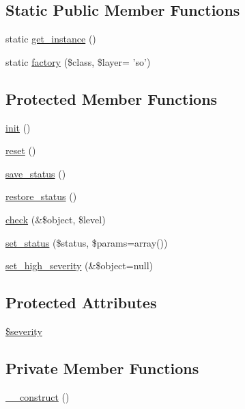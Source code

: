 \subsection*{Static Public Member Functions}
\begin{DoxyCompactItemize}
\item 
static \hyperlink{classOWL_ae75b698b8f0aa7f9106ce84744ff10ed}{get\_\-instance} ()
\item 
static \hyperlink{classOWL_aa6f4f99b9b0d6c77e7d49075d8a29d69}{factory} (\$class, \$layer= 'so')
\end{DoxyCompactItemize}
\subsection*{Protected Member Functions}
\begin{DoxyCompactItemize}
\item 
\hyperlink{class__OWL_ae0ef3ded56e8a6b34b6461e5a721cd3e}{init} ()
\item 
\hyperlink{class__OWL_a2f2a042bcf31965194c03033df0edc9b}{reset} ()
\item 
\hyperlink{class__OWL_a9e49b9c76fbc021b244c6915ea536d71}{save\_\-status} ()
\item 
\hyperlink{class__OWL_a465eeaf40edd9f9c848841700c32ce55}{restore\_\-status} ()
\item 
\hyperlink{class__OWL_ad6f4f6946f40199dd0333cf219fa500e}{check} (\&\$object, \$level)
\item 
\hyperlink{class__OWL_aea912d0ede9b3c2a69b79072d94d4787}{set\_\-status} (\$status, \$params=array())
\item 
\hyperlink{class__OWL_a576829692a3b66e3d518853bf43abae3}{set\_\-high\_\-severity} (\&\$object=null)
\end{DoxyCompactItemize}
\subsection*{Protected Attributes}
\begin{DoxyCompactItemize}
\item 
\hyperlink{class__OWL_ad26b40a9dbbacb33e299b17826f8327c}{\$severity}
\end{DoxyCompactItemize}
\subsection*{Private Member Functions}
\begin{DoxyCompactItemize}
\item 
\hyperlink{classOWL_a9240437570d0787f35b7a1102ee39cc6}{\_\-\_\-construct} ()
\end{DoxyCompactItemize}
